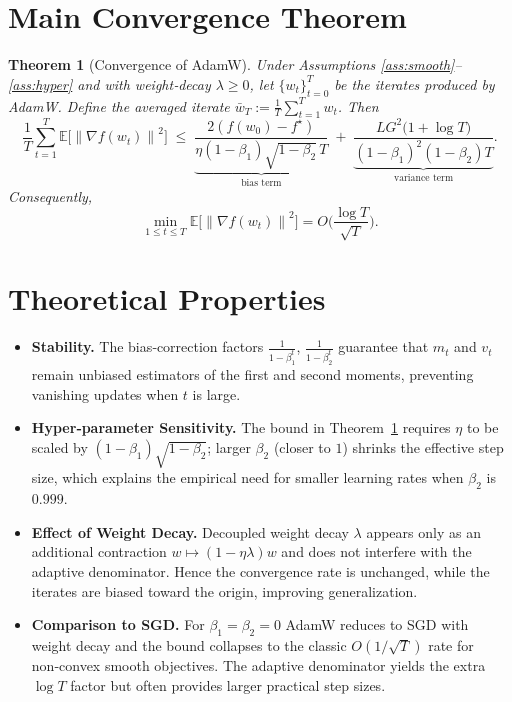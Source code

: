 \documentclass{article}
\newtheorem{theorem}{Theorem}
\newcommand{\E}{\mathbb{E}}
\newcommand{\norm}[1]{\left\lVert#1\right\rVert}
\begin{document}
\section*{Main Convergence Theorem}
\begin{theorem}[Convergence of AdamW]\label{thm:adamw}
Under Assumptions \ref{ass:smooth}–\ref{ass:hyper} and with weight‑decay $\lambda\ge0$, let $\{w_t\}_{t=0}^T$ be the iterates produced by AdamW.
Define the averaged iterate $\bar w_T:=\frac{1}{T}\sum_{t=1}^T w_t$.
Then
\[
\frac{1}{T}\sum_{t=1}^T \E\!\big[\norm{\nabla f(w_t)}^2\big]
\;\le\;
\underbrace{\frac{2(f(w_0)-f^\star)}{\eta (1-\beta_1)\sqrt{1-\beta_2}\,T}}_{\text{bias term}}
\;+\;
\underbrace{\frac{L G^2\big(1+\log T\big)}{(1-\beta_1)^2(1-\beta_2)T}}_{\text{variance term}} .
\]
Consequently,
\[
\min_{1\le t\le T}\E\!\big[\norm{\nabla f(w_t)}^2\big]=O\!\Big(\frac{\log T}{\sqrt{T}}\Big).
\]
\end{theorem}

\section*{Theoretical Properties}
\begin{itemize}[nosep]
\item \textbf{Stability.} The bias‑correction factors $\frac{1}{1-\beta_1^{t}}$, $\frac{1}{1-\beta_2^{t}}$ guarantee that $m_t$ and $v_t$ remain unbiased estimators of the first and second moments, preventing vanishing updates when $t$ is large.
\item \textbf{Hyper‑parameter Sensitivity.} The bound in Theorem~\ref{thm:adamw} requires $\eta$ to be scaled by $(1-\beta_1)\sqrt{1-\beta_2}$; larger $\beta_2$ (closer to $1$) shrinks the effective step size, which explains the empirical need for smaller learning rates when $\beta_2$ is $0.999$.
\item \textbf{Effect of Weight Decay.} Decoupled weight decay $\lambda$ appears only as an additional contraction $w\mapsto(1-\eta\lambda)w$ and does not interfere with the adaptive denominator. Hence the convergence rate is unchanged, while the iterates are biased toward the origin, improving generalization.
\item \textbf{Comparison to SGD.} For $\beta_1=\beta_2=0$ AdamW reduces to SGD with weight decay and the bound collapses to the classic $O(1/\sqrt{T})$ rate for non‑convex smooth objectives. The adaptive denominator yields the extra $\log T$ factor but often provides larger practical step sizes.
\end{itemize}
\end{document}
